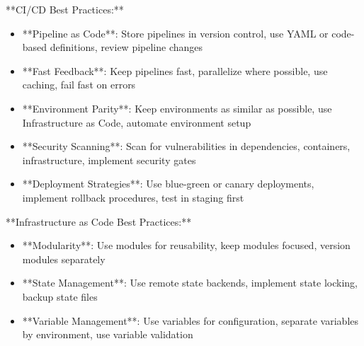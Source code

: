 \documentclass[11pt,a4paper]{article}
\begin{document}
**CI/CD Best Practices:**

\begin{itemize}
\item **Pipeline as Code**: Store pipelines in version control, use YAML or code-based definitions, review pipeline changes
\end{itemize}

\begin{itemize}
\item **Fast Feedback**: Keep pipelines fast, parallelize where possible, use caching, fail fast on errors
\end{itemize}

\begin{itemize}
\item **Environment Parity**: Keep environments as similar as possible, use Infrastructure as Code, automate environment setup
\end{itemize}

\begin{itemize}
\item **Security Scanning**: Scan for vulnerabilities in dependencies, containers, infrastructure, implement security gates
\end{itemize}

\begin{itemize}
\item **Deployment Strategies**: Use blue-green or canary deployments, implement rollback procedures, test in staging first
\end{itemize}

**Infrastructure as Code Best Practices:**

\begin{itemize}
\item **Modularity**: Use modules for reusability, keep modules focused, version modules separately
\end{itemize}

\begin{itemize}
\item **State Management**: Use remote state backends, implement state locking, backup state files
\end{itemize}

\begin{itemize}
\item **Variable Management**: Use variables for configuration, separate variables by environment, use variable validation
\end{itemize}
\end{document}
